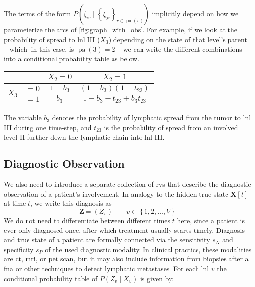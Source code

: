 \documentclass[twocolumn]{article}
\begin{document}
The terms of the form $P \left( \xi_{iv} \mid \left\{ \xi_{jr} \right\}_{r \in \operatorname{pa}(v)} \right)$ implicitly depend on how we parameterize the arcs of \cref{fig:graph_with_obs}. For example, if we look at the probability of spread to \gls{lnl} III ($X_3$) depending on the state of that level's parent -- which, in this case, is $\operatorname{pa}(3) = 2$ -- we can write the different combinations into a conditional probability table as below.

\begin{table}[!h]
\centering
\begin{tabular}{|cc|cc|}
    \hline
    & & $X_2=0$ & $X_2=1$ \\
    \hline
    \multirow{2}{*}{$X_3$} & $=0$ & $1-b_3$ & $(1-b_3)(1-t_{23})$ \\
    & $=1$ & $b_3$ & $1-b_3-t_{23}+b_3 t_{23}$ \\
    \hline
\end{tabular}
\end{table}

The variable $b_3$ denotes the probability of lymphatic spread from the tumor to \gls{lnl} III during one time-step, and $t_{23}$ is the probability of spread from an involved level II further down the lymphatic chain into \gls{lnl} III. 

\subsection{Diagnostic Observation}
\label{subsec:formalism:diagnosis}

We also need to introduce a separate collection of \glspl{rv} that describe the diagnostic observation of a patient's involvement. In analogy to the hidden true state $\mathbf{X}[t]$ at time $t$, we write this diagnosis as
%
\begin{equation}
    \mathbf{Z} = \left( Z_v \right) \qquad v \in \left\{ 1,2, \ldots, V \right\}
\end{equation}
%
We do not need to differentiate between different times $t$ here, since a patient is ever only diagnosed once, after which treatment usually starts timely.
Diagnosis and true state of a patient are formally connected via the sensitivity $s_N$ and specificity $s_P$ of the used diagnostic modality. In clinical practice, these modalities are \gls{ct}, \gls{mri}, or \gls{pet} scan, but it may also include information from biopsies after a \gls{fna} or other techniques to detect lymphatic metastases. For each \gls{lnl} $v$ the conditional probability table of $P\left( Z_v \mid X_v \right)$ is given by:
\end{document}
